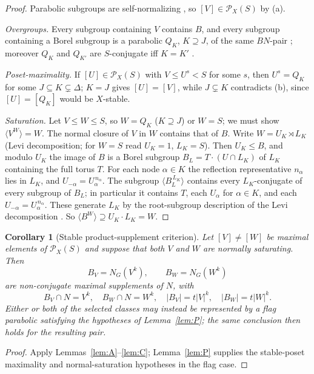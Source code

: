 \documentclass[11pt]{amsart}
\newtheorem{corollary}[theorem]{Corollary}
\theoremstyle{definition}
\theoremstyle{remark}
\newcommand{\Pos}{\mathcal{P}}
\begin{document}
\begin{proof}
Parabolic subgroups are self-normalizing
\cite[Thm.~8.3.3, p.~112]{Carter}, so
$[V]\in\Pos_X(S)$ by (a).

\emph{Overgroups.} Every subgroup containing $V$ contains $B$, and every
subgroup containing a Borel subgroup is a parabolic $Q_K$, $K\supseteq J$,
of the same $BN$-pair \cite[Thm.~8.3.2, p.~112]{Carter}; moreover $Q_K$
and $Q_{K'}$ are $S$-conjugate iff $K=K'$
\cite[Thm.~8.3.3, p.~112]{Carter}.

\emph{Poset-maximality.} If $[U]\in\Pos_X(S)$ with $V\leq U^s<S$ for some
$s$, then $U^s=Q_K$ for some $J\subseteq K\subsetneq\Delta$; $K=J$ gives
$[U]=[V]$, while $J\subsetneq K$ contradicts (b), since $[U]=[Q_K]$ would
be $X$-stable.

\emph{Saturation.} Let $V\leq W\leq S$, so $W=Q_K$ ($K\supseteq J$) or
$W=S$; we must show $\langle V^W\rangle=W$. The normal closure of $V$ in
$W$ contains that of $B$. Write $W=U_K\rtimes L_K$ (Levi decomposition;
for $W=S$ read $U_K=1$, $L_K=S$). Then $U_K\leq B$, and modulo $U_K$ the
image of $B$ is a Borel subgroup $B_L=T\cdot(U\cap L_K)$ of $L_K$
containing the full torus $T$. For each node $\alpha\in K$ the
reflection representative $n_\alpha$ lies in $L_K$, and
$U_{-\alpha}=U_\alpha^{\,n_\alpha}$. The subgroup
$\langle B_L^{\,L_K}\rangle$ contains every $L_K$-conjugate of every
subgroup of $B_L$; in particular it contains $T$, each $U_\alpha$ for
$\alpha\in K$, and each $U_{-\alpha}=U_\alpha^{\,n_\alpha}$.
These generate $L_K$ by the root-subgroup description of the Levi
decomposition \cite[\S8.5, pp.~118--120]{Carter}. So
$\langle B^W\rangle\supseteq U_K\cdot L_K=W$.
\end{proof}

\begin{corollary}[Stable product-supplement criterion]
\label{cor:supplement-engine}
Let $[V]\neq[W]$ be maximal elements of $\Pos_X(S)$ and suppose that both
$V$ and $W$ are normally saturating. Then
\[
 B_V=N_G(V^k),\qquad B_W=N_G(W^k)
\]
are non-conjugate maximal supplements of $N$, with
\[
 B_V\cap N=V^k,\quad B_W\cap N=W^k,\quad
 |B_V|=t|V|^k,\quad |B_W|=t|W|^k.
\]
Either or both of the selected classes may instead be represented by a flag
parabolic satisfying the hypotheses of Lemma~\ref{lem:P}; the same conclusion
then holds for the resulting pair.
\end{corollary}

\begin{proof}
Apply Lemmas~\ref{lem:A}--\ref{lem:C}; Lemma~\ref{lem:P} supplies the
stable-poset maximality and normal-saturation hypotheses in the flag case.
\end{proof}
\end{document}
